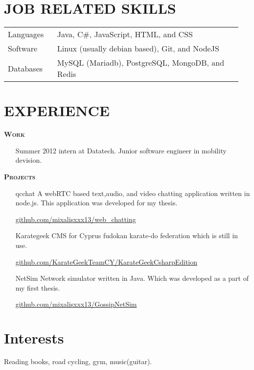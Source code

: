 \documentclass[margin, 10pt]{res} %
\begin{document}
\begin{resume}
\section{JOB RELATED SKILLS}

\begin{tabular}{p{0.2\linewidth} p{0.75\linewidth}}

Languages & Java, C\#, JavaScript, HTML, and CSS				\\
Software & Linux (usually debian based), Git, and NodeJS 				\\
Databases & MySQL (Mariadb), PostgreSQL, MongoDB, and Redis 	

\end{tabular} 
 
 
 
\section{EXPERIENCE} 

\textsc{ \textbf{Work}}

\begin{itemize}
\item[Summer 2012 intern] at Datatech. Junior software engineer in mobility devision. 
\end{itemize}

\textsc{ \textbf{Projects}}

\begin{itemize}

\item[qcchat] A webRTC based text,audio, and video chatting application written in node.js.
This application was developed for my thesis.

\href{https://github.com/mixalisxxx13/web_chatting}{github.com/mixalisxxx13/web\_chatting} \\



\item[Karategeek] CMS for Cyprus fudokan karate-do federation which is still in use. 

\href{https://github.com/KarateGeekTeamCY/KarateGeekCsharpEdition/tree/baseV4.5.1}{github.com/KarateGeekTeamCY/KarateGeekCsharpEdition} \\



\item[NetSim] Network simulator written in Java. 
Which was developed as a part of my first thesis.

\href{https://github.com/mixalisxxx13/GossipNetSim}{github.com/mixalisxxx13/GossipNetSim} 

\end{itemize}


\section{Interests}

Reading books, road cycling, gym, music(guitar). 

 


\end{resume}
\end{document}
